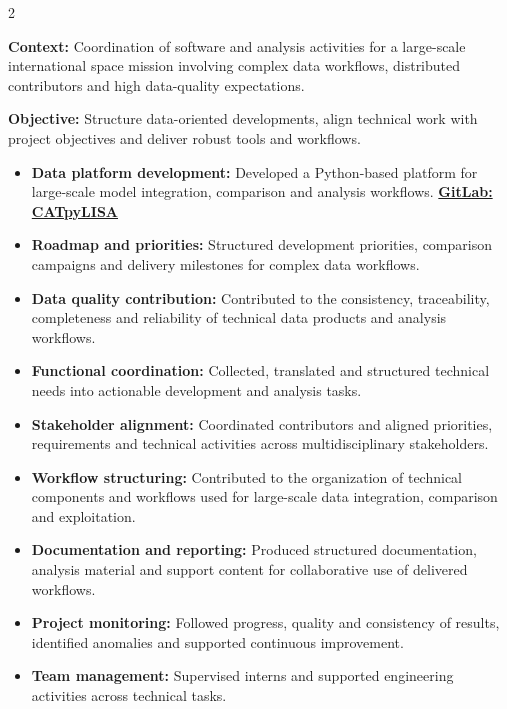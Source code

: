 \documentclass[8pt,a4paper,ragged2e,withhyper]{../_shared/altacv}
\begin{document}
\begin{paracol}{2}
\divider


\textbf{Context:} Coordination of software and analysis activities for a large-scale international space mission involving complex data workflows, distributed contributors and high data-quality expectations.

\textbf{Objective:} Structure data-oriented developments, align technical work with project objectives and deliver robust tools and workflows.

\begin{itemize}
\item \textbf{Data platform development:} Developed a Python-based platform for large-scale model integration, comparison and analysis workflows. \textcolor{DarkPastelRed}{\href{https://gitlab.oca.eu/gboileau/lisa_l3_tools}{\bf GitLab: CATpyLISA}}
\item \textbf{Roadmap and priorities:} Structured development priorities, comparison campaigns and delivery milestones for complex data workflows.
\item \textbf{Data quality contribution:} Contributed to the consistency, traceability, completeness and reliability of technical data products and analysis workflows.
\item \textbf{Functional coordination:} Collected, translated and structured technical needs into actionable development and analysis tasks.
\item \textbf{Stakeholder alignment:} Coordinated contributors and aligned priorities, requirements and technical activities across multidisciplinary stakeholders.
\item \textbf{Workflow structuring:} Contributed to the organization of technical components and workflows used for large-scale data integration, comparison and exploitation.
\item \textbf{Documentation and reporting:} Produced structured documentation, analysis material and support content for collaborative use of delivered workflows.
\item \textbf{Project monitoring:} Followed progress, quality and consistency of results, identified anomalies and supported continuous improvement.
\item \textbf{Team management:} Supervised interns and supported engineering activities across technical tasks.
\end{itemize}


\end{paracol}
\end{document}

